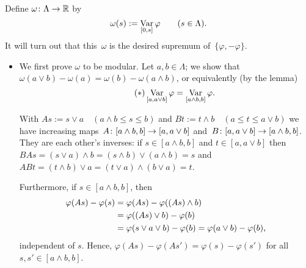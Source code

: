 \documentclass[main.tex]{subfiles}
\begin{document}
Define $\omega\colon\Lambda \rightarrow \mathbb{R}$ by
\begin{equation*}
\omega(s) := \mathop{\mathrm{Var}}_{[0,s]}\varphi \qquad (s\in \Lambda)\textnormal{.}
\end{equation*}
It will turn out that this~$\omega$ 
is the desired supremum of~$\{\varphi,-\varphi\}$.
\begin{itemize}
\item 
We first prove $\omega$ to be modular.
Let $a,b\in \Lambda$; we show that
$\omega(a\vee b) - \omega(a) = \omega(b) - \omega(a\wedge b)$,
or equivalently (by the lemma)
\begin{equation}
\label{eq1.10_1}  \tag{$*$}
\mathop{\mathrm{Var}}_{[a,a\vee b]}\varphi = \mathop{\mathrm{Var}}_{[a\wedge b,b]}\varphi 
\textnormal{.}
\end{equation}

With $As := s\vee a \quad (a\wedge b\leq s\leq b)$
and $Bt := t\wedge b \quad (a\leq t \leq a\vee b)$
we have increasing maps~$A\colon [a\wedge b,b]\rightarrow [a,a\vee b]$
and~$B\colon [a,a\vee b]\rightarrow[a\wedge b,b]$.
They are each other's inverses: 
if $s\in[a\wedge b, b]$ and $t\in [a,a\vee b]$
then~$BAs = (s\vee a)\wedge b = (s\wedge b) \vee (a\wedge b) = s$ 
and~$ABt = (t\wedge b)\vee a = (t\vee a)\wedge(b\vee a) = t$.

Furthermore, if $s\in [a\wedge b, b]$, then
\begin{align*}
\varphi(As) - \varphi(s) 
  & = \varphi(As) - \varphi ((As)\wedge b) \\
  & = \varphi((As)\vee b) - \varphi(b) \\
  & = \varphi(s\vee a\vee b)-\varphi(b) = \varphi(a\vee b)-\varphi(b)
\textnormal{,}
\end{align*}
independent of $s$.
Hence, $\varphi(As)-\varphi(As')=\varphi(s)-\varphi(s')$
for all $s,s'\in[a\wedge b,b]$.


\end{itemize}
\end{document}
